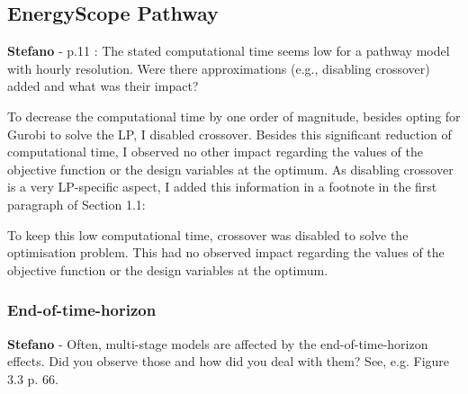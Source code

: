 \documentclass[12pt,a4paper]{article}
\begin{document}
\subsection{EnergyScope Pathway}
\label{ESPathway}
\begin{mdframed}[style=comment] %
{\color{orange} \textbf{Stefano}} - p.11 : The stated computational time seems low for a pathway model with hourly resolution. Were there approximations (e.g., disabling crossover) added and what was their impact?\end{mdframed}

\noindent To decrease the computational time by one order of magnitude, besides opting for Gurobi to solve the LP, I disabled crossover. Besides this significant reduction of computational time, I observed no other impact regarding the values of the objective function or the design variables at the optimum. As disabling crossover is a very LP-specific aspect, I added this information {\color{blue}in a footnote in the first paragraph of Section 1.1}:

\begin{mdframed}[style=manuscript] %
To keep this low computational time, crossover was disabled to solve the optimisation problem. This had no observed impact regarding the values of the objective function or the design variables at the optimum.
\end{mdframed}

\subsubsection{End-of-time-horizon}


\begin{mdframed}[style=comment] %
{\color{orange} \textbf{Stefano}} - Often, multi-stage models are affected by the end-of-time-horizon effects. Did you observe those and how did you deal with them? See, e.g. Figure 3.3 p. 66.
\end{mdframed}


\begin{mdframed}[style=manuscript] %

\end{mdframed}
\end{document}
